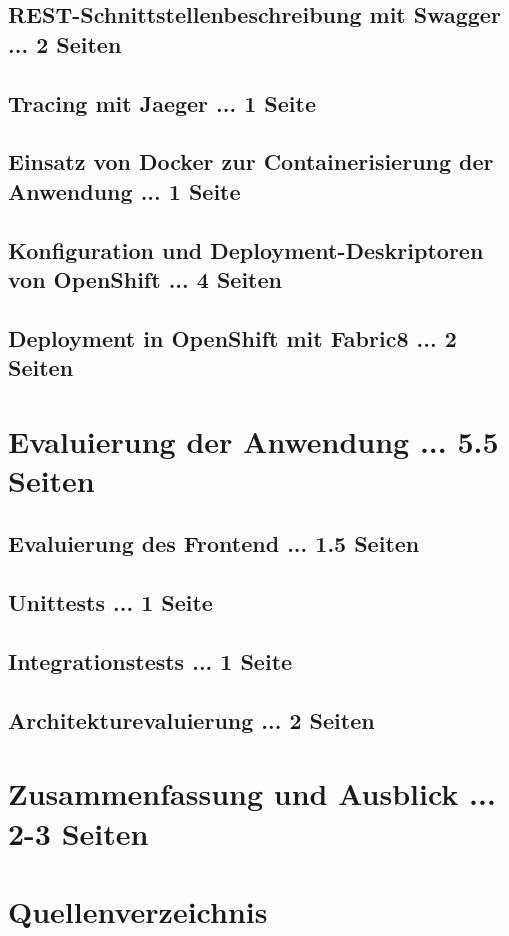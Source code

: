 \documentclass[master,german]{hgbthesis}
\begin{document}
\section{REST-Schnittstellenbeschreibung mit Swagger ... 2 Seiten}
\section{Tracing mit Jaeger ... 1 Seite}
\section{Einsatz von Docker zur Containerisierung der Anwendung ... 1 Seite}
\section{Konfiguration und Deployment-Deskriptoren von OpenShift ... 4 Seiten}
\section{Deployment in OpenShift mit Fabric8 ... 2 Seiten}


\chapter{Evaluierung der Anwendung ... 5.5 Seiten}
\section{Evaluierung des Frontend ... 1.5 Seiten}
\section{Unittests ... 1 Seite}
\section{Integrationstests ... 1 Seite}
\section{Architekturevaluierung ... 2 Seiten}

\chapter{Zusammenfassung und Ausblick ... 2-3 Seiten}

\chapter{Quellenverzeichnis}



\end{document}
